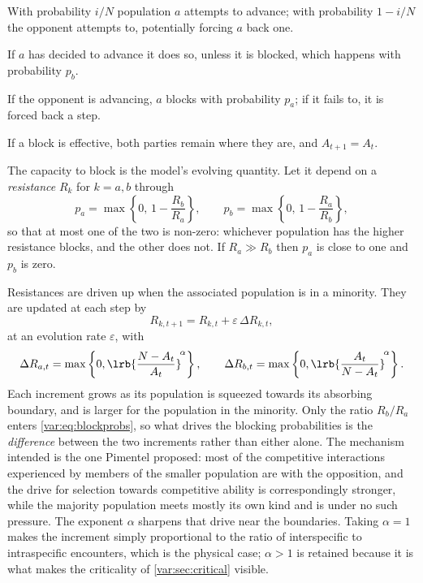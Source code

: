 \begin{description}[leftmargin=1.6em,style=unboxed,itemsep=0.15em]
\item[Whose move.] With probability $i/N$ population $a$ attempts to advance;
with probability $1-i/N$ the opponent attempts to, potentially forcing $a$
back one.
\item[Advancing.] If $a$ has decided to advance it does so, unless it is
blocked, which happens with probability $p_b$.
\item[Being advanced upon.] If the opponent is advancing, $a$ blocks with
probability $p_a$; if it fails to, it is forced back a step.
\item[Stalemate.] If a block is effective, both parties remain where they
are, and $A_{t+1}=A_t$.
\end{description}

The capacity to block is the model's evolving quantity. Let it depend on a
\emph{resistance} $R_k$ for $k=a,b$ through
\begin{equation}
p_a=\max\left\{0,\,1-\frac{R_b}{R_a}\right\},
\qquad
p_b=\max\left\{0,\,1-\frac{R_a}{R_b}\right\},
\label{var:eq:blockprobs}
\end{equation}
so that at most one of the two is non-zero: whichever population has the
higher resistance blocks, and the other does not. If $R_a\gg R_b$ then
$p_a$ is close to one and $p_b$ is zero.

Resistances are driven up when the associated population is in a minority.
They are updated at each step by
\begin{equation}
R_{k,t+1}=R_{k,t}+\varepsilon\,\Delta R_{k,t},
\label{var:eq:resistupdate}
\end{equation}
at an evolution rate $\varepsilon$, with
\begin{equation}
\Delta R_{a,t}=\max\left\{0,\lrb{\frac{N-A_t}{A_t}}^{\!\alpha}\right\},
\qquad
\Delta R_{b,t}=\max\left\{0,\lrb{\frac{A_t}{N-A_t}}^{\!\alpha}\right\}.
\label{var:eq:dR}
\end{equation}
Each increment grows as its population is squeezed towards its absorbing
boundary, and is larger for the population in the minority. Only the ratio
$R_b/R_a$ enters \cref{var:eq:blockprobs}, so what drives the blocking
probabilities is the \emph{difference} between the two increments rather than
either alone. The
mechanism intended is the one Pimentel proposed: most of the competitive
interactions experienced by members of the smaller population are with the
opposition, and the drive for selection towards competitive ability is
correspondingly stronger, while the majority population meets mostly its own
kind and is under no such pressure. The exponent $\alpha$ sharpens that
drive near the boundaries. Taking $\alpha=1$ makes the increment simply
proportional to the ratio of interspecific to intraspecific encounters, which
is the physical case; $\alpha>1$ is retained because it is what makes the
criticality of \cref{var:sec:critical} visible.

